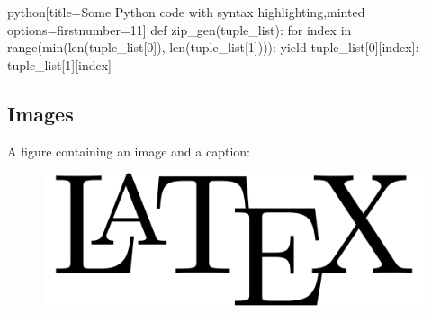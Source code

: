 \begin{code}{python}[title={Some Python code with syntax highlighting},minted options={firstnumber=11}]
def zip_gen(tuple_list):
    for index in range(min(len(tuple_list[0]), len(tuple_list[1]))):
        yield {tuple_list[0][index]: tuple_list[1][index]}
\end{code}

\subsection{Images}

A figure containing an image and a caption:
\begin{figure}[H]
    \includegraphics[width=0.8\linewidth]{LaTeX-logo.png}
\end{figure}
